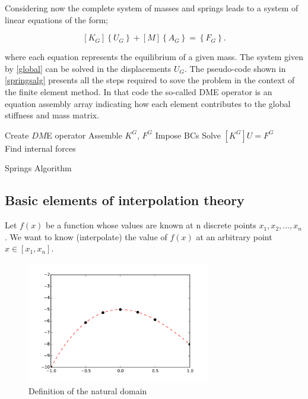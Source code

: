 Considering now the complete system of masses and springs leads to a system of linear equations of the form;

\begin{equation}
\left[ {{K_G}} \right]\left\{ {{U_G}} \right\} + \left[ M \right]\left\{ {{A_G}} \right\} = \left\{ {{F_G}} \right\}.
\label{global}
\end{equation}

where each equation represents the equilibrium of a given mass. The system given by \cref{global} can be solved in the displacements $U_G$. The pseudo-code shown in \cref{springsalg} presents all the steps required to sove the problem in the context of the finite element method. In that code the so-called DME operator is an equation assembly array indicating how each element contributes to the global stiffness and mass matrix.


\begin{algorithm}[H]
 \SetAlgoLined
 Create $DM$E operator\;
 Assemble $K^G$, $F^G$\;
Impose BCs\;
Solve $[K^G]U=F^G$\\
Find internal forces
\caption{Springs Algorithm}
\label{springsalg}
\end{algorithm}


\subsection{Basic elements of interpolation theory}
Let $f(x)$ be a function whose values are known at n discrete points ${x_1, x_2,...,x_n}$. We want to know (interpolate) the value of $f(x)$ at an arbitrary point $x \in \left[ {{x_1},{x_n}} \right]$.

\begin{figure}[h]
\centering
\includegraphics[width=8cm]{img/interpol1.pdf}
\caption{Definition of the natural domain}
\label{fig:interpol1}
\end{figure}

